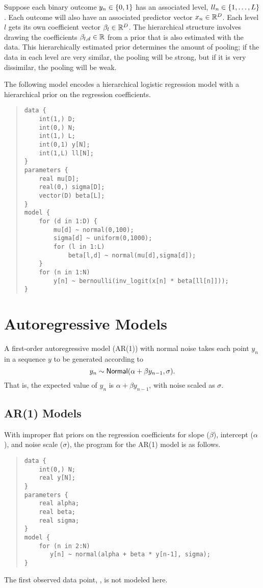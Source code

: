 Suppose each binary outcome $y_n \in \{ 0,1 \}$ has an associated
level, $ll_n \in \{ 1,\ldots,L \}$.  Each outcome will also have
an associated predictor vector $x_n \in \mathbb{R}^D$.  Each level $l$
gets its own coefficient vector $\beta_l \in \mathbb{R}^D$.  The
hierarchical structure involves drawing the coefficients $\beta_{l,d}
\in \mathbb{R}$ from a prior that is also estimated with the data.  This
hierarchically estimated prior determines the amount of pooling; if
the data in each level are very similar, the pooling will be strong,
but if it is very dissimilar, the pooling will be weak.

The following model encodes a hierarchical logistic regression model
with a hierarchical prior on the regression coefficients.
%
\begin{quote}
\begin{Verbatim}
data {
    int(1,) D;
    int(0,) N;
    int(1,) L;
    int(0,1) y[N];
    int(1,L) ll[N];
}
parameters {
    real mu[D];
    real(0,) sigma[D];
    vector(D) beta[L];
}
model {
    for (d in 1:D) {
        mu[d] ~ normal(0,100);
        sigma[d] ~ uniform(0,1000);
        for (l in 1:L)
            beta[l,d] ~ normal(mu[d],sigma[d]);
    }
    for (n in 1:N)
        y[n] ~ bernoulli(inv_logit(x[n] * beta[ll[n]]));
}
\end{Verbatim}
\end{quote}   


\section{Autoregressive Models}

A first-order autoregressive model (AR(1)) with normal noise takes
each point $y_n$ in a sequence $y$ to be generated according to
%
\[
y_n \sim \mbox{\sf Normal}(\alpha + \beta y_{n-1}, \sigma).
\]
%
That is, the expected value of $y_n$ is $\alpha + \beta y_{n-1}$, with
noise scaled as $\sigma$.

\subsection{AR(1) Models}

With improper flat priors on the regression coefficients for slope
($\beta$), intercept ($\alpha$), and noise scale ($\sigma$),
the \Stan program for the AR(1) model is as follows.
%
\begin{quote}
\begin{Verbatim}
data {
    int(0,) N;
    real y[N];
}
parameters {
    real alpha;
    real beta;
    real sigma;
}
model {
    for (n in 2:N)
       y[n] ~ normal(alpha + beta * y[n-1], sigma);
}
\end{Verbatim}
\end{quote}
%
The first observed data point, , is not modeled here.  

